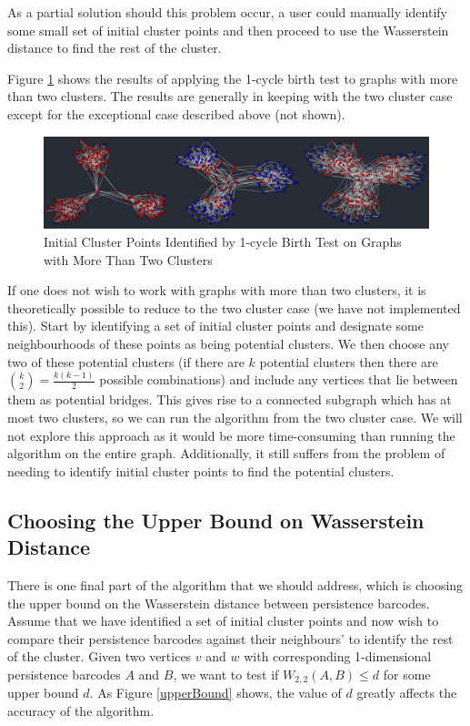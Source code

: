 \documentclass[12pt,a4paper]{amsart}
\numberwithin{equation}{section}
\theoremstyle{plain}
\theoremstyle{definition}
\begin{document}
As a partial solution should this problem occur, a user could manually identify some small set of initial cluster points and then proceed to use the Wasserstein distance to find the rest of the cluster.

Figure \ref{multiclusters} shows the results of applying the 1-cycle birth test to graphs with more than two clusters. The results are generally in keeping with the two cluster case except for the exceptional case described above (not shown).

\begin{figure}[h]
	\centering	
	\includegraphics[scale=0.45]{Multiclusters.jpg}
	\caption{Initial Cluster Points Identified by 1-cycle Birth Test on Graphs with More Than Two Clusters}
	\label{multiclusters}
\end{figure}

If one does not wish to work with graphs with more than two clusters, it is theoretically possible to reduce to the two cluster case (we have not implemented this). Start by identifying a set of initial cluster points and designate some neighbourhoods of these points as being potential clusters. We then choose any two of these potential clusters (if there are $k$ potential clusters then there are $\binom{k}{2} = \frac{k(k-1)}{2}$ possible combinations) and include any vertices that lie between them as potential bridges. This gives rise to a connected subgraph which has at most two clusters, so we can run the algorithm from the two cluster case. We will not explore this approach as it would be more time-consuming than running the algorithm on the entire graph. Additionally, it still suffers from the problem of needing to identify initial cluster points to find the potential clusters.

\subsection{Choosing the Upper Bound on Wasserstein Distance}

There is one final part of the algorithm that we should address, which is choosing the upper bound on the Wasserstein distance between persistence barcodes. Assume that we have identified a set of initial cluster points and now wish to compare their persistence barcodes against their neighbours' to identify the rest of the cluster. Given two vertices $v$ and $w$ with corresponding 1-dimensional persistence barcodes $A$ and $B$, we want to test if $W_{2,2}(A,B) \leq d$ for some upper bound $d$. As Figure \ref{upperBound} shows, the value of $d$ greatly affects the accuracy of the algorithm.
\end{document}
